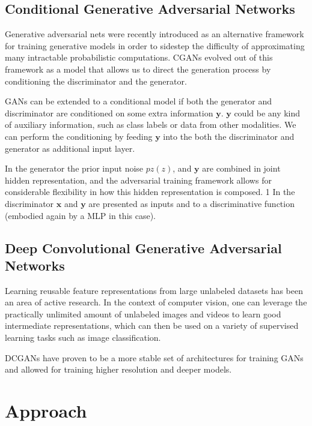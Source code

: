 \documentclass[twocolumn,10pt,cleanfoot]{asme2ej}
\begin{document}
\subsection{Conditional Generative Adversarial Networks}
Generative adversarial nets were recently introduced as an alternative framework for training generative models in order to sidestep the difficulty of approximating many intractable probabilistic computations. CGANs evolved out of this framework as a model that allows us to direct the generation process by conditioning the discriminator and the generator.

GANs can be extended to a conditional model if both the generator and discriminator are conditioned on some extra information $\boldsymbol{y}$. $\boldsymbol{y}$ could be any kind of auxiliary information, such as class labels or data from other modalities. We can perform the conditioning by feeding $\boldsymbol{y}$ into the both the discriminator and generator as additional input layer.

In the generator the prior input noise $pz(z)$, and $\boldsymbol{y}$ are combined in joint hidden representation, and
the adversarial training framework allows for considerable flexibility in how this hidden representation is composed. 1
In the discriminator $\boldsymbol{x}$ and $\boldsymbol{y}$ are presented as inputs and to a discriminative function (embodied
again by a MLP in this case).

\subsection{Deep Convolutional Generative Adversarial Networks}

Learning reusable feature representations from large unlabeled datasets has been an area of active research. In the context of computer vision, one can leverage the practically unlimited amount of unlabeled images and videos to learn good intermediate representations, which can then be used on a variety of supervised learning tasks such as image classification.

DCGANs have proven to be a more stable set of architectures for training GANs and allowed for training higher resolution and deeper models.


\section{Approach\\}
\end{document}
